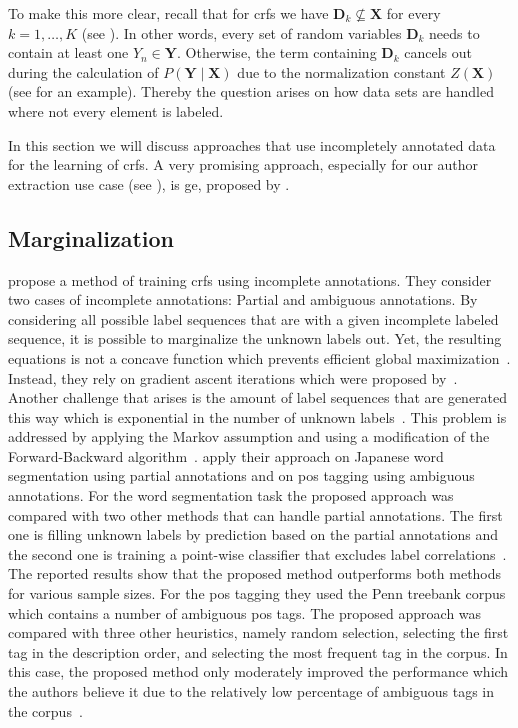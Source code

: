 To make this more clear, recall that for \glspl{crf} we have $\bm{D}_k\not\subseteq\bm{X}$ for every $k=1,\dots,K$ (see ).
In other words, every set of \glspl{random variable} $\bm{D}_k$ needs to contain at least one $Y_n\in\bm{Y}$.
Otherwise, the term containing $\bm{D}_k$ cancels out during the calculation of $P(\bm{Y}\mid\bm{X})$ due to the normalization constant $Z(\bm{X})$ (see  for an example).
Thereby the question arises on how data sets are handled where not every element is labeled.

In this section we will discuss approaches that use incompletely annotated data for the learning of \glspl{crf}.
A very promising approach, especially for our author extraction use case (see ), is \gls{ge}, proposed by \citet{mann2007simple}.

\subsection{Marginalization}
\citet{tsuboi2008training} propose a method of training \glspl{crf} using incomplete annotations.
They consider two cases of incomplete annotations: Partial and ambiguous annotations.
By considering all possible label sequences that are with a given incomplete labeled sequence, it is possible to marginalize the unknown labels out.
Yet, the resulting equations is not a concave function which prevents efficient global maximization~\citep{tsuboi2008training}.
Instead, they rely on gradient ascent iterations which were proposed by~\citep{sha2003shallow}.
Another challenge that arises is the amount of label sequences that are generated this way which is exponential in the number of unknown labels~\citep{tsuboi2008training}.
This problem is addressed by applying the Markov assumption and using a modification of the Forward-Backward algorithm~\citep{tsuboi2008training}.
\citet{tsuboi2008training} apply their approach on Japanese word segmentation using partial annotations and on \gls{pos} tagging using ambiguous annotations.
For the word segmentation task the proposed approach was compared with two other methods that can handle partial annotations.
The first one is filling unknown labels by prediction based on the partial annotations and the second one is training a point-wise classifier that excludes label correlations~\citep{tsuboi2008training}.
The reported results show that the proposed method outperforms both methods for various sample sizes.
For the \gls{pos} tagging they used the Penn treebank corpus \citep{marcus1993building} which contains a number of ambiguous \gls{pos} tags.
The proposed approach was compared with three other heuristics, namely random selection, selecting the first tag in the description order, and selecting the most frequent tag in the corpus.
In this case, the proposed method only moderately improved the performance which the authors believe it due to the relatively low percentage of ambiguous tags in the corpus~\citep{tsuboi2008training}.

